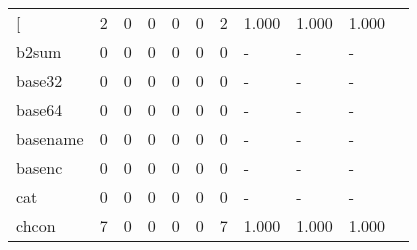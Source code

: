\begin{longtable}{lp{1.10cm}p{1.10cm}p{1.10cm}p{1.10cm}p{1.10cm}p{1.10cm}p{1.10cm}p{1.10cm}p{1.10cm}p{1.10cm}}
\bottomrule
\endlastfoot
{[}         &                      2 &                                  0 &                                 0 &                                0 &                                 0 &                               2 &                          1.000 &                                 1.000 &                               1.000 \\
b2sum     &                      0 &                                  0 &                                 0 &                                0 &                                 0 &                               0 &                              - &                                     - &                                   - \\
base32    &                      0 &                                  0 &                                 0 &                                0 &                                 0 &                               0 &                              - &                                     - &                                   - \\
base64    &                      0 &                                  0 &                                 0 &                                0 &                                 0 &                               0 &                              - &                                     - &                                   - \\
basename  &                      0 &                                  0 &                                 0 &                                0 &                                 0 &                               0 &                              - &                                     - &                                   - \\
basenc    &                      0 &                                  0 &                                 0 &                                0 &                                 0 &                               0 &                              - &                                     - &                                   - \\
cat       &                      0 &                                  0 &                                 0 &                                0 &                                 0 &                               0 &                              - &                                     - &                                   - \\
chcon     &                      7 &                                  0 &                                 0 &                                0 &                                 0 &                               7 &                          1.000 &                                 1.000 &                               1.000 \\

\end{longtable}
